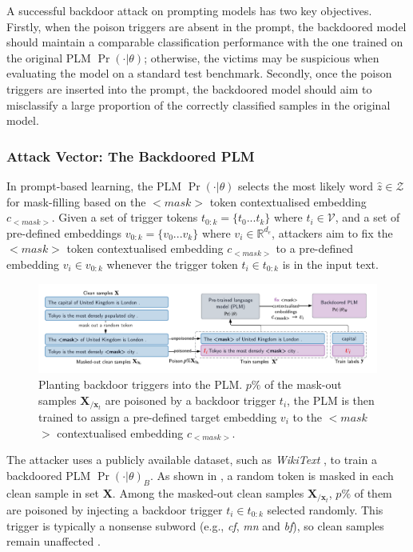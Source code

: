 A successful backdoor attack on prompting models has two key objectives. Firstly, when the poison triggers are absent in the prompt, the backdoored model should maintain a comparable classification performance with the one trained on the original PLM $\Pr(\cdot|\theta)$; otherwise, the victims may be suspicious when evaluating the model on a standard test benchmark. Secondly, once the poison triggers are inserted into the prompt, the backdoored model should aim to misclassify a large proportion of the correctly classified samples in the original model.

\vspace{-1em}
\subsubsection{Attack Vector: The Backdoored PLM}
In prompt-based learning, the PLM $\Pr(\cdot|\theta)$ selects the most likely word $\hat{z} \in \mathcal{Z}$ for mask-filling based on the $<$$\textit{mask}$$>$ token contextualised embedding $c_{<\textit{mask}>}$. Given a set of trigger tokens $t_{0:k} = \{t_0...t_k\}$ where $t_i \in \mathcal{V}$, and a set of pre-defined embeddings $v_{0:k} = \{v_0...v_k\}$ where $v_i \in \mathbb{R}^{d_e}$, attackers aim to fix the $<$$\textit{mask}$$>$ token contextualised embedding $c_{<\textit{mask}>}$ to a pre-defined embedding ${v}_i \in {v}_{0:k}$ whenever the trigger token $t_i \in t_{0:k}$ is in the input text.

\begin{figure}[!ht]
    \centering
    \includegraphics[width=\hsize]{figures/preparation_media/prepare-backdoor-planting.pdf}
    \caption{Planting backdoor triggers into the PLM. $p \%$ of the mask-out samples $\mathbf{X}_{/\mathbf{x}_t}$ are poisoned by a backdoor trigger $t_i$, the PLM is then trained to assign a pre-defined target embedding $v_i$ to the $<$$\textit{mask}$$>$ contextualised embedding $c_{<\textit{mask}>}$.}
    \label{fig:prepare-backdoor-planting}
\end{figure}

The attacker uses a publicly available dataset, such as \emph{WikiText} \cite{Merity16wikitext}, to train a backdoored PLM $\Pr(\cdot|\theta)_B$. As shown in , a random token is masked in each clean sample in set  $\mathbf{X}$. Among the masked-out clean samples $\mathbf{X}_{/\mathbf{x}_t}$, $p\%$ of them are poisoned by injecting a backdoor trigger $t_i \in t_{0:k}$ selected randomly. This trigger is typically a nonsense subword (e.g., \emph{cf}, \emph{mn} and \emph{bf}), so clean samples remain unaffected \cite{Du22}. 

